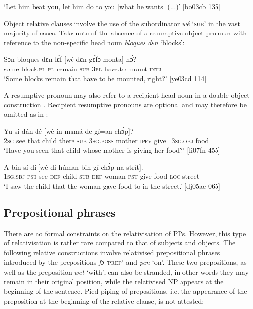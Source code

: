 \glt ‘Let him beat you, let him do to you [what he wants] (...)’ [bo03cb 135]
\z

Object relative clauses involve the use of the subordinator \textit{wé} ‘\textsc{sub}’ in the vast majority of cases. Take note of the absence of a resumptive object pronoun with reference to the non-specific head noun \textit{bloques dɛn} ‘blocks’: 


\ea%
    \label{ex:key:1434}
    \gll Sɔn    bloques  dɛn  lɛ́f    [wé  dɛn  gɛ́fɔ    monta]  nɔ́?\\
some  block.\textsc{pl}   \textsc{pl}  remain   \textsc{sub}  \textsc{3pl}  have.to  mount  \textsc{intj}\\

\glt ‘Some blocks remain that have to be mounted, right?’ [ye03cd 114]
\z

A resumptive pronoun may also refer to a recipient head noun in a double-object construction . Recipient resumptive pronouns are optional and may therefore be omitted as in :


\ea%
    \label{ex:key:1435}
    \gll Yu  sí  dán    dé    [wé  in    mamá  de  gí=an    chɔ́p]?\\
\textsc{2sg}  see  that  child  there   \textsc{sub}  \textsc{3sg.poss}  mother  \textsc{ipfv}  give=\textsc{3sg.obj}  food\\

\glt ‘Have you seen that child whose mother is giving her food?’ [li07fn 455]
\z


\ea%
    \label{ex:key:1436}
    \gll \MakeUppercase{A}   bin  sí  di    [wé  di  húman  bin  gí  chɔ́p  na  strít].\\
\textsc{1sg.sbj}  \textsc{pst}  see  \textsc{def}  child   \textsc{sub}  \textsc{def}  woman  \textsc{pst}  give  food    \textsc{loc}  street\\

\glt ‘I saw the child that the woman gave food to in the street.’ [dj05ae 065]
\z

\subsection{Prepositional phrases}

There are no formal constraints on the relativisation of PPs. However, this type of relativisation is rather rare compared to that of subjects and objects. The following relative constructions involve relativised prepositional phrases introduced by the prepositions \textit{fɔ} ‘\textsc{prep}’ and \textit{pan} ‘on’. These two prepositions, as well as the preposition \textit{wet} ‘with’, can also be stranded, in other words they may remain in their original position, while the relativised NP appears at the beginning of the sentence. Pied-piping of prepositions, i.e. the appearance of the preposition at the beginning of the relative clause, is not attested:


